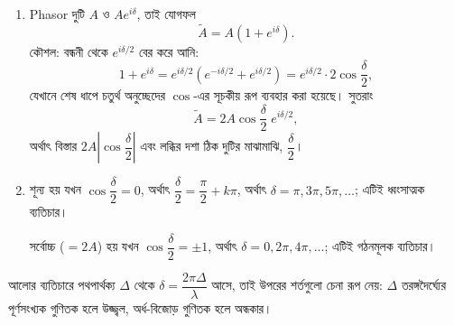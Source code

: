 \documentclass[11pt]{article}
\begin{document}
\begin{sol}
\begin{enumerate}
  \item Phasor দুটি $A$ ও $Ae^{i\delta}$, তাই যোগফল
        \[
          \tilde{A} = A\left( 1 + e^{i\delta} \right) .
        \]
        কৌশল: বন্ধনী থেকে $e^{i\delta/2}$ বের করে আনি:
        \[
          1 + e^{i\delta} = e^{i\delta/2}\left( e^{-i\delta/2}
          + e^{i\delta/2} \right) = e^{i\delta/2} \cdot 2\cos\frac{\delta}{2} ,
        \]
        যেখানে শেষ ধাপে চতুর্থ অনুচ্ছেদের $\cos$-এর সূচকীয় রূপ ব্যবহার করা
        হয়েছে। সুতরাং
        \[
          \tilde{A} = 2A\cos\frac{\delta}{2}\;e^{i\delta/2} ,
        \]
        অর্থাৎ বিস্তার $2A\left| \cos\dfrac{\delta}{2} \right|$ এবং লব্ধির
        দশা ঠিক দুটির মাঝামাঝি, $\dfrac{\delta}{2}$।
  \item শূন্য হয় যখন $\cos\dfrac{\delta}{2} = 0$, অর্থাৎ
        $\dfrac{\delta}{2} = \dfrac{\pi}{2} + k\pi$, অর্থাৎ
        $\delta = \pi, 3\pi, 5\pi, \dots$; এটিই ধ্বংসাত্মক ব্যতিচার।

        সর্বোচ্চ ($=2A$) হয় যখন $\cos\dfrac{\delta}{2} = \pm 1$, অর্থাৎ
        $\delta = 0, 2\pi, 4\pi, \dots$; এটিই গঠনমূলক ব্যতিচার।
\end{enumerate}
আলোর ব্যতিচারে পথপার্থক্য $\Delta$ থেকে $\delta = \dfrac{2\pi\Delta}{\lambda}$
আসে, তাই উপরের শর্তগুলো চেনা রূপ নেয়: $\Delta$ তরঙ্গদৈর্ঘ্যের পূর্ণসংখ্যক
গুণিতক হলে উজ্জ্বল, অর্ধ-বিজোড় গুণিতক হলে অন্ধকার।
\end{sol}
\end{document}

